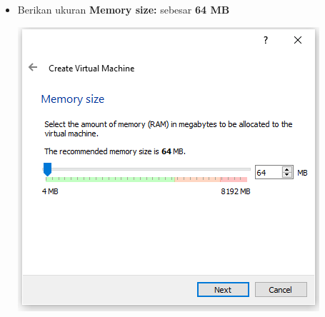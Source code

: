 \documentclass{article}
\begin{document}
\begin{flushleft}
\begin{itemize}
        	\item Berikan ukuran \textbf{Memory size:} sebesar \textbf{64 MB} \\
        		\begin{center}
        			\includegraphics[scale=0.6]{(3)}
				\end{center}
				

\end{itemize}
\end{flushleft}
\end{document}
